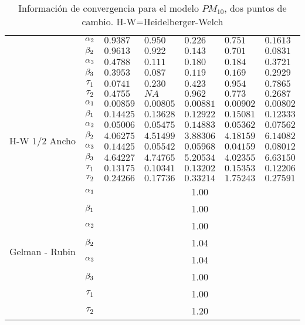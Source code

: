 \begin{table}[!h]
\begin{tabular}{|l|c|l|l|l|l|l|}
\cline{2-7}
& $\alpha_2$& $ 0.9387 $ & $0.950$ & $0.226$ & $ 0.751$ & $0.1613$\\
\cline{2-7}
& $\beta_2$& $0.9613 $ & $0.922$ & $0.143 $ & $0.701$ & $0.0831$\\
\cline{2-7}
& $\alpha_3$& $0.4788 $ & $0.111$ & $0.180$ & $0.184$ & $0.3721$\\
\cline{2-7}
& $\beta_3$& $0.3953 $ & $0.087$ & $0.119$ & $0.169$ & $0.2929$\\
\cline{2-7}
& $\tau_1$& $0.0741  $ & $0.230 $ & $0.423$ & $0.954$ & $0.7865$\\
\cline{2-7}
& $\tau_2$& $0.4755 $ & $NA$ & $0.962$ & $0.773$ & $0.2687$\\
  \cline{1-7}
  \multirow{8}{2.5cm}{H-W $1/2$ Ancho} & $\alpha_1$ & $0.00859$ & $0.00805 $ & $0.00881$ & $0.00902$  & $ 0.00802$\\ \cline{2-7}
& $\beta_1$& $0.14425  $ & $0.13628$ & $0.12922$ & $0.15081$ & $0.12333 $\\
\cline{2-7}
& $\alpha_2$& $0.05006$ & $0.05475$ & $0.14883 $ & $0.05362$ & $0.07562$\\
\cline{2-7}
& $\beta_2$& $4.06275 $ & $4.51499$ & $3.88306$ & $4.18159$ & $6.14082$\\
\cline{2-7}
& $\alpha_3$& $0.14425 $ & $0.05542$ & $0.05968$ & $0.04159$ & $0.08012$\\
\cline{2-7}
& $\beta_3$& $4.64227 $ & $4.74765$ & $5.20534$ & $4.02355$ & $6.63150$\\
\cline{2-7}
& $\tau_1$& $0.13175$ & $0.10341$ & $0.13202$ & $0.15353$ & $0.12206$\\
\cline{2-7}
& $\tau_2$& $0.24266 $ & $0.17736$ & $0.33214 $ & $1.75243$ & $0.27591 $\\
  \cline{1-7}

\multirow{8}{2.5cm}{Gelman - Rubin} & $\alpha_1$ & \multicolumn{5}{|c|}{1.00}\\ \cline{2-7}
&$\beta_1$ &  \multicolumn{5}{|c|}{1.00} \\ \cline{2-7}
&$\alpha_2$ &  \multicolumn{5}{|c|}{1.00} \\ \cline{2-7}
&$\beta_2$ &  \multicolumn{5}{|c|}{1.04} \\ \cline{2-7}
&$\alpha_3$ &  \multicolumn{5}{|c|}{1.04} \\ \cline{2-7}
&$\beta_3$ &  \multicolumn{5}{|c|}{1.00} \\ \cline{2-7}
&$\tau_1$ &  \multicolumn{5}{|c|}{1.00} \\ \cline{2-7}
&$\tau_2$ &  \multicolumn{5}{|c|}{1.20} \\ \cline{1-7}



\end{tabular}
\caption{Información de convergencia para el modelo $PM_{10}$, dos puntos de cambio. H-W=Heidelberger-Welch}
\label{convergencia_dpdc_pm10}
\end{table}




